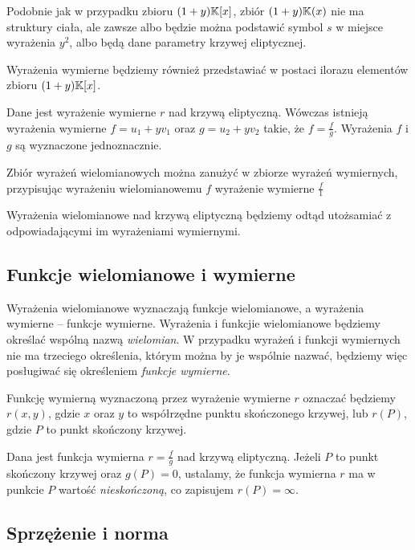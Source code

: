 Podobnie jak w przypadku zbioru $(1 + y)\mathbb{K}[x]$,
zbiór $(1 + y)\mathbb{K}(x)$ nie ma struktury ciała,
ale zawsze albo będzie można podstawić symbol $s$ w miejsce wyrażenia $y^2$,
albo będą dane parametry krzywej eliptycznej.

Wyrażenia wymierne będziemy również przedstawiać w postaci ilorazu
elementów zbioru $(1 + y)\mathbb{K}[x]$.

\begin{lemma}
Dane jest wyrażenie wymierne $r$ nad krzywą eliptyczną.
Wówczas istnieją wyrażenia wymierne
$f = u_1 + yv_1$ oraz $g = u_2 + yv_2$ takie,
że $f = \frac{f}{g}$.
Wyrażenia $f$ i $g$ są wyznaczone jednoznacznie.
\end{lemma}

Zbiór wyrażeń wielomianowych można zanużyć w zbiorze wyrażeń wymiernych,
przypisując wyrażeniu wielomianowemu $f$ wyrażenie wymierne $\frac{f}{1}$

\begin{remark}
Wyrażenia wielomianowe nad krzywą eliptyczną
będziemy odtąd utożsamiać z odpowiadającymi im wyrażeniami wymiernymi.
\end{remark}

\subsection*{Funkcje wielomianowe i wymierne}

Wyrażenia wielomianowe wyznaczają funkcje wielomianowe,
a wyrażenia wymierne -- funkcje wymierne.
Wyrażenia i funkcjie wielomianowe będziemy określać
wspólną nazwą \emph{wielomian}.
W przypadku wyrażeń i funkcji wymiernych nie ma trzeciego określenia,
którym można by je wspólnie nazwać,
będziemy więc posługiwać się określeniem \emph{funkcje wymierne}.

\begin{remark}
Funkcję wymierną wyznaczoną przez wyrażenie wymierne $r$
oznaczać będziemy $r(x, y)$,
gdzie $x$ oraz $y$ to współrzędne punktu skończonego krzywej,
lub $r(P)$, gdzie $P$ to punkt skończony krzywej.
\end{remark}

\begin{remark}
Dana jest funkcja wymierna $r = \frac{f}{g}$ nad krzywą eliptyczną.
Jeżeli $P$ to punkt skończony krzywej oraz $g(P) = 0$,
ustalamy, że funkcja wymierna $r$ ma w punkcie $P$
wartość \emph{nieskończoną},
co zapisujem $r(P) = \infty$.
\end{remark}

\subsection*{Sprzężenie i norma}

